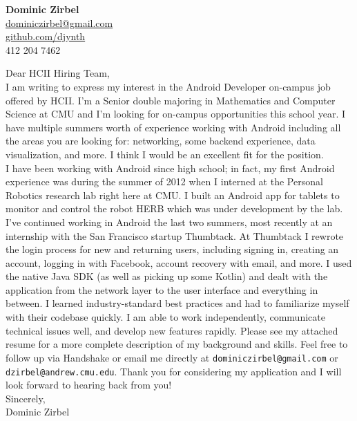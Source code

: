 \documentclass[letterpaper,10pt]{article}
\newcommand{\lb}{\vspace{14pt} \\}
\begin{document}
\thispagestyle{empty}

\begin{flushright}
    \textbf{\Large{Dominic Zirbel}} \\
    \href{mailto:dominiczirbel@gmail.com}{dominiczirbel@gmail.com} \\
    \href{https://github.com/djynth}{github.com/djynth} \\
    412 204 7462
\end{flushright}

\vspace{36pt}

Dear HCII Hiring Team,
\lb
I am writing to express my interest in the Android Developer on-campus job offered by HCII. I'm a Senior double majoring in Mathematics and Computer Science at CMU and I'm looking for on-campus opportunities this school year. I have multiple summers worth of experience working with Android including all the areas you are looking for: networking, some backend experience, data visualization, and more. I think I would be an excellent fit for the position.
\lb
I have been working with Android since high school; in fact, my first Android experience was during the summer of 2012 when I interned at the Personal Robotics research lab right here at CMU. I built an Android app for tablets to monitor and control the robot HERB which was under development by the lab. I've continued working in Android the last two summers, most recently at an internship with the San Francisco startup Thumbtack. At Thumbtack I rewrote the login process for new and returning users, including signing in, creating an account, logging in with Facebook, account recovery with email, and more. I used the native Java SDK (as well as picking up some Kotlin) and dealt with the application from the network layer to the user interface and everything in between. I learned industry-standard best practices and had to familiarize myself with their codebase quickly. I am able to work independently, communicate technical issues well, and develop new features rapidly.
\vspace{14pt}
Please see my attached resume for a more complete description of my background and skills. Feel free to follow up via Handshake or email me directly at \texttt{dominiczirbel@gmail.com} or \texttt{dzirbel@andrew.cmu.edu}. Thank you for considering my application and I will look forward to hearing back from you!
\lb
Sincerely, \\
Dominic Zirbel
\end{document}
